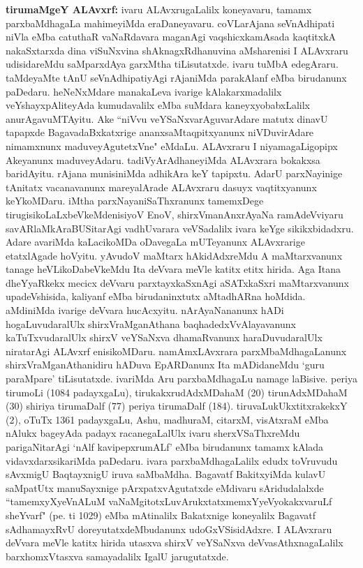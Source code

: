 {\textbf{tirumaMgeY ALAvxrf:}} ivaru ALAvxrugaLalilx koneyavaru, tamamx parxbaMdhagaLa mahimeyiMda eraDaneyavaru. coVLarAjana seVnAdhipati niVla eMba catuthaR vaNaRdavara maganAgi vaqshicxkamAsada kaqtitxkA nakaSxtarxda dina viSuNxvina shAknagxRdhanuvina aMsharenisi I ALAvxraru udisidareMdu saMparxdAya garxMtha tiLisutatxde. ivaru tuMbA edegAraru. taMdeyaMte tAnU seVnAdhipatiyAgi rAjaniMda parakAlanf eMba birudanunx paDedaru. heNeNxMdare manakaLeva ivarige kAlakarxmadalilx veYshayxpAliteyAda kumudavalilx eMba suMdara kaneyxyobabxLalilx anurAgavuMTAyitu. Ake ``niVvu veYSaNxvarAguvarAdare matutx dinavU tapapxde BagavadaBxkatxrige ananxsaMtaqpitxyanunx niVDuvirAdare nimamxnunx maduveyAgutetxVne" eMdaLu. ALAvxraru I niyamagaLigopipx Akeyanunx maduveyAdaru. tadiVyArAdhaneyiMda ALAvxrara bokakxsa baridAyitu. rAjana munisiniMda adhikAra keY tapipxtu. AdarU parxNayinige tAnitatx vacanavanunx mareyalArade ALAvxraru dasuyx vaqtitxyanunx keYkoMDaru. iMtha parxNayaniSaThxranunx tamemxDege tirugisikoLaLxbeVkeMdenisiyoV EnoV, shirxVmanAnxrAyaNa ramAdeVviyaru savARlaMkAraBUSitarAgi vadhUvarara veVSadalilx ivara keYge sikikxbidadxru. Adare avariMda kaLacikoMDa oDavegaLa mUTeyanunx ALAvxrarige etatxlAgade hoVyitu. yAvudoV maMtarx hAkidAdxreMdu A maMtarxvanunx tanage heVLikoDabeVkeMdu Ita deVvara meVle katitx etitx hirida. Aga Itana dheYyaRkekx mecicx deVvaru parxtayxkaSxnAgi aSATxkaSxri maMtarxvanunx upadeVshisida, kaliyanf eMba birudaninxtutx aMtadhARna hoMdida. aMdiniMda ivarige deVvara hucAcxyitu. nArAyaNananunx hADi hogaLuvudaralUlx shirxVraMganAthana baqhadedxVvAlayavanunx kaTuTxvudaralUlx shirxV veYSaNxva dhamaRvanunx haraDuvudaralUlx niratarAgi ALAvxrf enisikoMDaru. namAmxLAvxrara parxMbaMdhagaLanunx shirxVraMganAthanidiru hADuva EpARDanunx Ita mADidaneMdu `guru paraMpare' tiLisutatxde. ivariMda Aru parxbaMdhagaLu namage laBisive. periya tirumoLi ({\rm 1084} padayxgaLu), tirukakxrudAdxMDahaM ({\rm 20}) tirunAdxMDahaM ({\rm 30}) shiriya tirumaDalf ({\rm 77}) periya tirumaDalf ({\rm 184}). tiruvaLukUkxtitxrakekxY ({\rm 2}), oTuTx {\rm 1361} padayxgaLu, Ashu, madhuraM, citarxM, visAtxraM eMba nAlukx bageyAda padayx racanegaLalUlx ivaru sherxVSaThxreMdu parigaNitarAgi `nAlf kavipepxrumALf' eMba birudanunx tamamx kAlada vidavxdarxsikariMda paDedaru. ivara parxbaMdhagaLalilx edudx toVruvudu sAvxmigU BaqtayxnigU iruva saMbaMdha. Bagavatf BakitxyiMda kulavU saMpatUtx manuSayxnige pArxpatxvAgutatxde eMdivaru sAridudalalxde ``tamemxyXyeVnALuM vaNaMgitotxLuvArukxtatxmemxYyeVyokakxvaruLf sheYvarf" (pe. ti {\rm 1029}) eMba mAtinalilx Bakatxnige koneyalilx Bagavatf sAdhamayxRvU doreyutatxdeMbudanunx udoGxVSisidAdxre. I ALAvxraru deVvara meVle katitx hirida utasxva shirxV veYSaNxva deVvasAthxnagaLalilx barxhomxVtasxva samayadalilx IgalU jarugutatxde.

